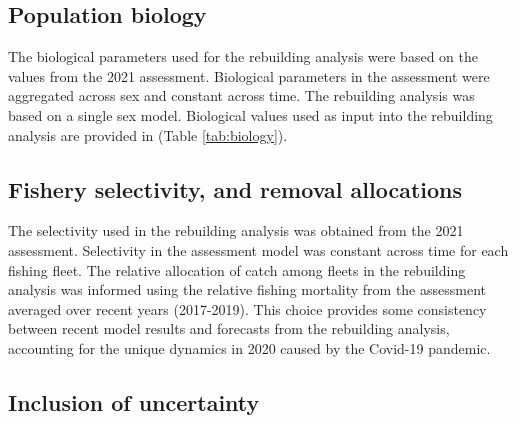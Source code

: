 \documentclass[11pt,
  english,
  a4paper,
]{article}
\begin{document}
\leavevmode\tagmcend\tagstructend\par


\hypertarget{population-biology}{%
\subsection{Population biology}\label{population-biology}}

\leavevmode\tagmcend\tagstructend


The biological parameters used for the rebuilding analysis were based on the values from the 2021 assessment. Biological parameters in the assessment were aggregated across sex and constant across time. The rebuilding analysis was based on a single sex model. Biological values used as input into the rebuilding analysis are provided in (Table \ref{tab:biology}).

\leavevmode\tagmcend\tagstructend\par


\hypertarget{fishery-selectivity-and-removal-allocations}{%
\subsection{Fishery selectivity, and removal allocations}\label{fishery-selectivity-and-removal-allocations}}

\leavevmode\tagmcend\tagstructend


The selectivity used in the rebuilding analysis was obtained from the 2021 assessment. Selectivity in the assessment model was constant across time for each fishing fleet. The relative allocation of catch among fleets in the rebuilding analysis was informed using the relative fishing mortality from the assessment averaged over recent years (2017-2019). This choice provides some consistency between recent model results and forecasts from the rebuilding analysis, accounting for the unique dynamics in 2020 caused by the Covid-19 pandemic.

\leavevmode\tagmcend\tagstructend\par


\hypertarget{inclusion-of-uncertainty}{%
\subsection{Inclusion of uncertainty}\label{inclusion-of-uncertainty}}
\end{document}
